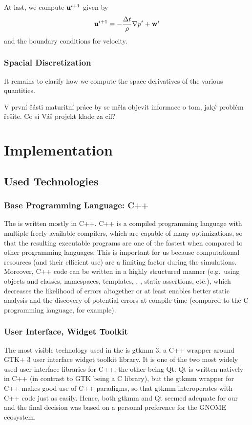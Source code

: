 \documentclass[11pt,a4paper,twoside,openright]{report}
\begin{document}
At last, we compute $\mathbf u^{i+1}$ given by
\begin{align*}
	\mathbf u^{i+1}=-\frac{\Delta t}\rho\nabla p^i+\mathbf w^i
\end{align*}
and the boundary conditions for velocity.

\subsection{Spacial Discretization}
It remains to clarify how we compute the space derivatives of the various quantities.

V první části maturitní práce by se měla objevit informace o tom, jaký problém řešíte. Co si Váš projekt klade za cíl?

\chapter{Implementation}

\section{Used Technologies}
\subsection{Base Programming Language: C++}
The \software{} is written mostly in C++. C++ is a compiled programming language with multiple freely available compilers, which are capable of many optimizations, so that the resulting executable programs are one of the fastest when compared to other programming languages. This is important for us because computational resources (and their efficient use) are a limiting factor during the simulations. Moreover, C++ code can be written in a highly structured manner (e.g.\ using objects and classes, namespaces, templates, , , static assertions, etc.), which decreases the likelihood of errors altogether or at least enables better static analysis and the discovery of potential errors at compile time (compared to the C programming language, for example). 

\subsection{User Interface, Widget Toolkit}
The most visible technology used in the \software{} is gtkmm 3, a C++ wrapper around GTK+ 3 user interface widget toolkit library. It is one of the two most widely used user interface libraries for C++, the other being Qt. Qt is written natively in C++ (in contrast to GTK being a C library), but the gtkmm wrapper for C++ makes good use of C++ paradigms, so that gtkmm interoperates with C++ code just as easily. Hence, both gtkmm and Qt seemed adequate for our \software{} and the final decision was based on a personal preference for the GNOME ecosystem.
\end{document}
